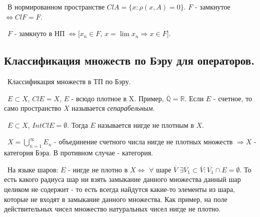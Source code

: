 \bigskip
\noindent \textbullet~В нормированном пространстве $Cl A = \{ x : \rho(x, A) = 0\}$. $F$ - замкнутое $\Longleftrightarrow Cl F = F$.

\smallskip 
\noindent \textbullet~$F$ - замкнуто в НП $\Longleftrightarrow [x_n \in F$, $x = \lim x_n \Rightarrow x \in F]$.


\subsection*{Классификация множеств по Бэру для операторов.}

\noindent \textasteriskcentered~Классификация множеств в ТП по Бэру.

\smallskip 
\noindent \textasteriskcentered~$E \subset X$, $Cl E = X$, $E$ - всюдо плотное в X. Пример, $\overline{\mathbb{Q}} = \mathbb{R}$. Если $E$ - счетное, то само пространство $X$ называется \textit{сепарабельным}.

\smallskip
\noindent \textasteriskcentered~$E \subset X$, $Int Cl E = \emptyset$. Тогда $E$ называется нигде не плотным в $X$.

\smallskip 
\noindent \textasteriskcentered~$X = \bigcup\limits_{n = 1}^{\infty} E_n$ - объединение счетного числа нигде не плотных множеств $\Rightarrow X $ -  категория Бэра. В противном случае -  категория.

\medskip 
\noindent \textbullet~На языке шаров: $E$ - нигде не плотно в $X \Longleftrightarrow$ $\forall$ шаре $\overline{V} \; \exists \overline{V_1} \subset \overline{V} : \overline{V_1} \cap E = \emptyset$. То есть какого радиуса шар ни взять замыкание данного множества данный шар целиком не содержит - то есть всегда найдутся какие-то элементы из шара, которые не входят в замыкание данного множества. Как пример, на поле действительных чисел множество натуральных чисел нигде не плотно.

